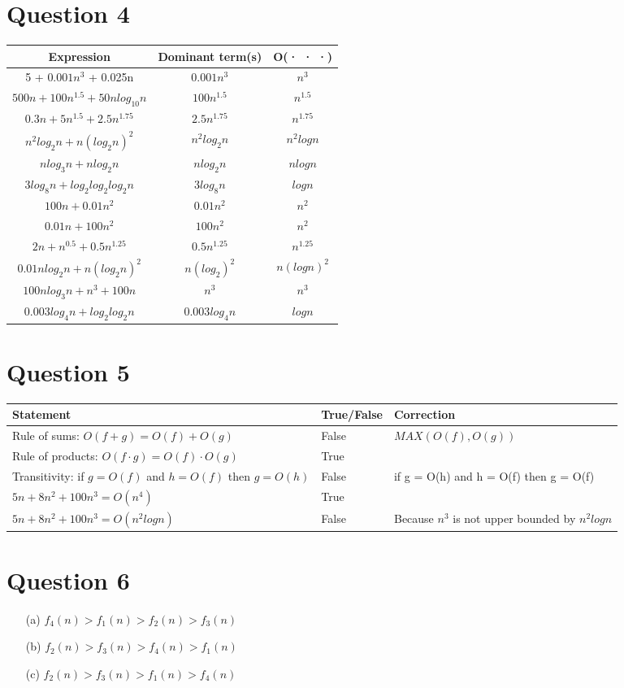 \documentclass{report}
\begin{document}
	\section*{Question 4}
	\begin{center}
	\centering
	\begin{tabular}{|c|c|c|}
		\hline Expression & Dominant term(s) & O(· · ·) \\
		\hline 5 + $0.001n^3$ + 0.025n &  $0.001n^3$ & $n^3$ \\
		\hline $500n + 100n^{1.5} + 50n log_{10} n$ & $100n^{1.5}$ & $n^{1.5}$ \\
		\hline $0.3n + 5n^{1.5} + 2.5n^{1.75}$ & $2.5n^{1.75}$ & $n^{1.75}$ \\
		\hline $n^{2}log_{2}n + n(log_{2}n)^2$ & $n^2log_{2}n$ & $n^2logn$ \\
		\hline $n log_{3}n + n log_{2}n$ & $n log_{2}n$ & $n logn$ \\
		\hline $3 log_{8}n + log_{2}log_{2}log_{2}n$ & $3log_{8}n$ & $logn$ \\
		\hline $100n + 0.01n^2$ & $0.01n^2$ & $n^2$ \\
		\hline $0.01n + 100n^2$ & $100n^2$ & $n^2$ \\
		\hline $2n + n^{0.5} + 0.5n^{1.25}$ & $0.5n^{1.25}$ & $n^{1.25}$ \\
		\hline $0.01n log_{2}n + n(log_{2}n)^2$ & $n(log_{2})^2$ & $n(logn)^2$ \\
		\hline $100n log_3 n + n^3 + 100n$ & $n^3$ & $n^3$ \\
		\hline $0.003 log_4 n + log_2log_	2 n$ & $0.003 log_4 n$ & $logn$ \\
		\hline 
	\end{tabular}
	\end{center}
	\section*{Question 5}
	\begin{tabular}{|l|l|l|}
		\hline
		Statement & True/False & Correction \\
		\hline Rule of sums: \(O(f + g) = O(f) + O(g)\) & False & $MAX(O(f), O(g))$ \\
		\hline Rule of products: \(O(f \cdot g) = O(f) \cdot O(g)\) & True & \\
		\hline Transitivity: if \(g = O(f)\) and \(h = O(f)\) then \(g = O(h)\) & False & if g = O(h) and h = O(f) then g = {O}(f) \\
		\hline $5n + 8n^2 + 100n^3 = O(n^4)$ & True & \\
		\hline $5n + 8n^2 + 100n^3 = O(n^2log n)$ & False & Because $n^3$ is not upper bounded by $n^2log n$ \\		
		\hline
	\end{tabular}
	
	\section*{Question 6}
	\begin{itemize}
		\item[(a)] $f_4(n) > f_1(n) > f_2(n) > f_3(n)$ 
		\item[(b)] $f_2(n) > f_3(n) > f_4(n) > f_1(n)$
		\item[(c)] $f_2(n) > f_3(n) > f_1(n) > f_4(n)$  
	\end{itemize}
\end{document}
